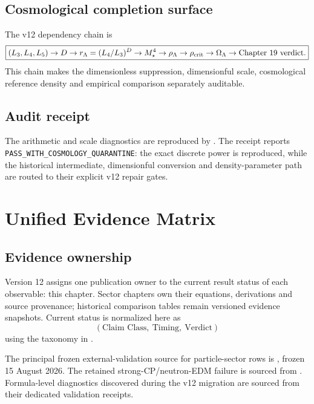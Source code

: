 \section{Cosmological completion surface}

The v12 dependency chain is
\[
\boxed{
(L_3,L_4,L_5)
\to D
\to r_\Lambda=(L_4/L_3)^D
\to M_\star^4
\to\rho_\Lambda
\to\rho_{\rm crit}
\to\Omega_\Lambda
\to\text{Chapter 19 verdict}.
}
\]
This chain makes the dimensionless suppression, dimensionful scale, cosmological reference density and empirical comparison separately auditable.

\section{Audit receipt}

The arithmetic and scale diagnostics are reproduced by
.
The receipt
reports \texttt{PASS\_WITH\_COSMOLOGY\_QUARANTINE}: the exact discrete power is reproduced, while the historical intermediate, dimensionful conversion and density-parameter path are routed to their explicit v12 repair gates.

\clearpage

\chapter{Unified Evidence Matrix}
\label{ch:v12_evidence_matrix}

\section{Evidence ownership}

Version 12 assigns one publication owner to the current result status of each observable: this chapter. Sector chapters own their equations, derivations and source provenance; historical comparison tables remain versioned evidence snapshots. Current status is normalized here as
\[
\boxed{(\text{Claim Class},\ \text{Timing},\ \text{Verdict})}
\]
using the taxonomy in .

The principal frozen external-validation source for particle-sector rows is
, frozen 15 August 2026. The retained strong-CP/neutron-EDM failure is sourced from . Formula-level diagnostics discovered during the v12 migration are sourced from their dedicated validation receipts.

